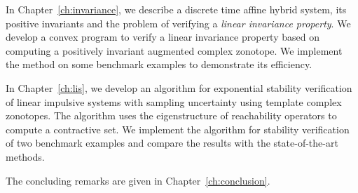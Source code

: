 In Chapter~\ref{ch:invariance}, we describe a discrete time affine
hybrid system, its positive invariants and the problem of verifying a
\emph{linear invariance property}.  We develop a convex program to
verify a linear invariance property based on computing a positively
invariant augmented complex zonotope.  We implement the method on
some benchmark examples to demonstrate its efficiency.

In Chapter~\ref{ch:lis}, we develop an algorithm for exponential
stability verification of linear impulsive systems with sampling
uncertainty using template complex zonotopes.  The algorithm uses the
eigenstructure of reachability operators to compute a contractive set.
We implement the algorithm for stability verification of two benchmark
examples and compare the results with the state-of-the-art methods.

The concluding remarks are given in Chapter~\ref{ch:conclusion}.


